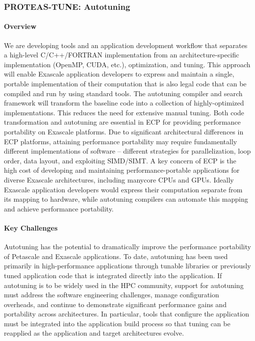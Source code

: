 \subsubsection{ PROTEAS-TUNE: Autotuning} 

\paragraph{Overview}

We are developing tools and an application development workflow that separates a high-level C/C++/FORTRAN implementation from an architecture-specific implementation (OpenMP, CUDA, etc.), optimization, and  tuning.   This  approach
will enable Exascale application  developers to express and  maintain a
single, portable implementation of their computation that is also legal code
that can be compiled and run by using standard tools.   The autotuning compiler
and search framework will transform the baseline code into a   collection of
highly-optimized implementations. This reduces the need for extensive manual tuning.
Both code transformation and autotuning are essential in ECP for providing
performance portability on Exascale platforms.  Due to significant architectural
differences in ECP platforms, attaining performance portability may  require
fundamentally different  implementations of software -- different strategies for
parallelization, loop order,  data layout, and exploiting SIMD/SIMT.  A key
concern of ECP is the high cost of developing  and maintaining
performance-portable applications for  diverse Exascale architectures, including
manycore CPUs and GPUs. 
Ideally Exascale application developers would express their
computation separate from   its mapping to hardware, while autotuning compilers can automate this mapping and achieve performance portability.

\paragraph{Key  Challenges}
Autotuning has the potential to dramatically improve the performance portability of Petascale and Exascale applications.  To date, autotuning has been used primarily in high-performance applications through tunable libraries or previously tuned application code that is integrated directly into the application.
If autotuning is to be widely used in the HPC community,
support for autotuning must address the software engineering challenges, manage configuration overheads, and continue to demonstrate significant performance gains and portability across architectures.
In particular, tools that configure the application must be integrated into the application build process so that tuning can be reapplied as the application and target architectures evolve.

